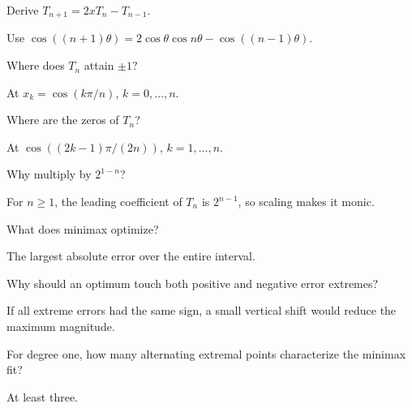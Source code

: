 \begin{problem}[Recurrence]\label{prob:ii22-problem-02}
Derive $T_{n+1}=2xT_n-T_{n-1}$.
\end{problem}
\begin{solution}
Use $\cos((n+1)\theta)=2\cos\theta\cos n\theta-\cos((n-1)\theta)$.
\end{solution}

\begin{problem}[Extrema]\label{prob:ii22-problem-03}
Where does $T_n$ attain $\pm1$?
\end{problem}
\begin{solution}
At $x_k=\cos(k\pi/n)$, $k=0,\dots,n$.
\end{solution}

\begin{problem}[Zeros]\label{prob:ii22-problem-04}
Where are the zeros of $T_n$?
\end{problem}
\begin{solution}
At $\cos((2k-1)\pi/(2n))$, $k=1,\dots,n$.
\end{solution}

\begin{problem}\label{prob:ii22-problem-05}
Why multiply by $2^{1-n}$?
\end{problem}
\begin{solution}
For $n\ge1$, the leading coefficient of $T_n$ is $2^{n-1}$, so scaling makes it monic.
\end{solution}

\begin{problem}\label{prob:ii22-problem-06}
What does minimax optimize?
\end{problem}
\begin{solution}
The largest absolute error over the entire interval.
\end{solution}

\begin{problem}\label{prob:ii22-problem-07}
Why should an optimum touch both positive and negative error extremes?
\end{problem}
\begin{solution}
If all extreme errors had the same sign, a small vertical shift would reduce the maximum magnitude.
\end{solution}

\begin{problem}\label{prob:ii22-problem-08}
For degree one, how many alternating extremal points characterize the minimax fit?
\end{problem}
\begin{solution}
At least three.
\end{solution}

